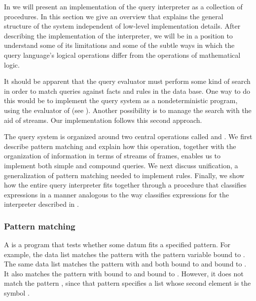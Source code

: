 In  we will present an implementation of the query
interpreter as a collection of procedures.  In this section we give an overview
that explains the general structure of the system independent of low-level
implementation details.  After describing the implementation of the
interpreter, we will be in a position to understand some of its limitations and
some of the subtle ways in which the query language's logical operations differ
from the operations of mathematical logic.

It should be apparent that the query evaluator must perform some kind of search
in order to match queries against facts and rules in the data base.  One way to
do this would be to implement the query system as a nondeterministic program,
using the  evaluator of  (see ).
Another possibility is to manage the search with the aid of streams.  Our
implementation follows this second approach.

The query system is organized around two central operations called
 and .  We first describe
pattern matching and explain how this operation, together with the organization
of information in terms of streams of frames, enables us to implement both
simple and compound queries.  We next discuss unification, a generalization of
pattern matching needed to implement rules.  Finally, we show how the entire
query interpreter fits together through a procedure that classifies expressions
in a manner analogous to the way  classifies expressions for the
interpreter described in .

\subsubsection*{Pattern matching}

A  is a program that tests whether some datum fits a
specified pattern.  For example, the data list  matches
the pattern  with the pattern variable  bound to
.  The same data list matches the pattern  with
 and  both bound to  and  bound to
.  It also matches the pattern  with
 bound to  and  bound to .  However, it does
not match the pattern , since that pattern specifies a list
whose second element is the symbol .

